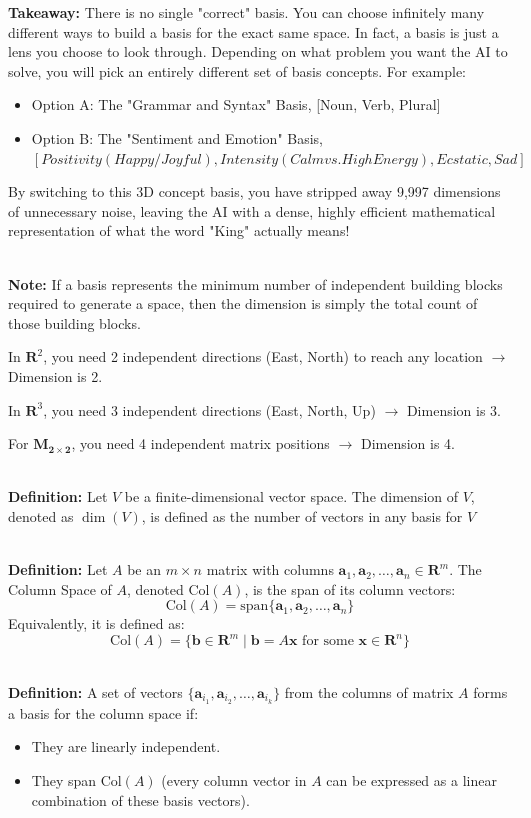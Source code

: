 \documentclass[DIV=20,oneside]{scrartcl}
\newcounter{problem}
\newcommand{\note}{
	\noindent\textbf{\\Note: }
}
\newcommand{\takeaway}[1]{%
	\begin{tcolorbox}[
		colback=black!20,
		colframe=black,
		boxrule=0.5pt,
		arc=2mm]
		\textbf{Takeaway: } #1
	\end{tcolorbox}
}
\newcommand{\deff}{
	\noindent\textbf{\\Definition: }
}
\begin{document}
 \takeaway{There is no single "correct" basis. You can choose infinitely many different ways to build a basis for the exact same space. In fact, a basis is just a lens you choose to look through. Depending on what problem you want the AI to solve, you will pick an entirely different set of basis concepts. For example:
\begin{itemize}
	\item Option A: The "Grammar and Syntax" Basis, [Noun, Verb, Plural]
	\item Option B: The "Sentiment and Emotion" Basis,\\ $[Positivity (Happy/Joyful), Intensity (Calm vs. High Energy), Ecstatic, Sad]$
\end{itemize}
By switching to this 3D concept basis, you have stripped away 9,997 dimensions of unnecessary noise, leaving the AI with a dense, highly efficient mathematical representation of what the word "King" actually means!}
\note If a basis represents the minimum number of independent building blocks required to generate a space, then the dimension is simply the total count of those building blocks. 

In $\mathbf{R}^2$, you need 2 independent directions (East, North) to reach any location $\rightarrow$ Dimension is 2.

In $\mathbf{R}^3$, you need 3 independent directions (East, North, Up) $\rightarrow$ Dimension is 3.

For $\mathbf{M_{2\times2}}$, you need 4 independent matrix positions $\rightarrow$ Dimension is 4.


\deff Let $V$ be a finite-dimensional vector space. The dimension of $V$, denoted as $\dim(V)$, is defined as the number of vectors in any basis for $V$

\deff Let $A$ be an $m \times n$ matrix with columns $\mathbf{a}_1, \mathbf{a}_2, \dots, \mathbf{a}_n \in \mathbf{R}^m$. The Column Space of $A$, denoted $\text{Col}(A)$, is the span of its column vectors:$$\text{Col}(A) = \text{span}\{\mathbf{a}_1, \mathbf{a}_2, \dots, \mathbf{a}_n\}$$Equivalently, it is defined as:$$\text{Col}(A) = \{ \mathbf{b} \in \mathbf{R}^m \mid \mathbf{b} = A\mathbf{x} \text{ for some } \mathbf{x} \in \mathbf{R}^n \}$$

\deff A set of vectors $\{\mathbf{a}_{i_1}, \mathbf{a}_{i_2}, \dots, \mathbf{a}_{i_k}\}$ from the columns of matrix $A$ forms a basis for the column space if:
\begin{itemize}
	\item They are linearly independent.
	\item They span $\text{Col}(A)$ (every column vector in $A$ can be expressed as a linear combination of these basis vectors).
\end{itemize}
\end{document}
